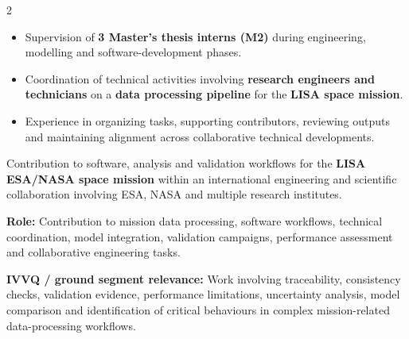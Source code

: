 \documentclass[8pt,a4paper,ragged2e,withhyper]{altacv}
\begin{document}
\begin{paracol}{2}

\begin{itemize}
  \item Supervision of \textbf{3 Master's thesis interns (M2)} during engineering, modelling and software-development phases.
  \item Coordination of technical activities involving \textbf{research engineers and technicians} on a \textbf{data processing pipeline} for the \textbf{LISA space mission}.
  \item Experience in organizing tasks, supporting contributors, reviewing outputs and maintaining alignment across collaborative technical developments.
\end{itemize}


\divider

\divider

\medskip


\divider

\divider

\divider


\end{paracol}



Contribution to software, analysis and validation workflows for the \textbf{LISA ESA/NASA space mission} within an international engineering and scientific collaboration involving ESA, NASA and multiple research institutes.

\textbf{Role:} Contribution to mission data processing, software workflows, technical coordination, model integration, validation campaigns, performance assessment and collaborative engineering tasks.

\textbf{IVVQ / ground segment relevance:} Work involving traceability, consistency checks, validation evidence, performance limitations, uncertainty analysis, model comparison and identification of critical behaviours in complex mission-related data-processing workflows.
\end{document}
